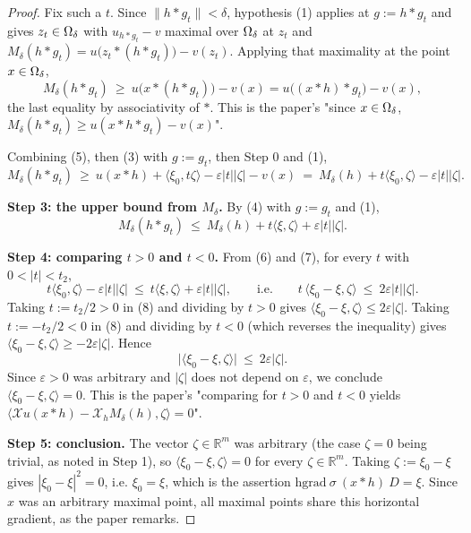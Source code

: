 \begin{proof}
Fix such a $t$. Since $\|h*g_t\|<\delta$, hypothesis (1) applies at $g:=h*g_t$ and gives
$z_t\in\Omega_\delta$ with $u_{h*g_t}-v$ maximal over $\Omega_\delta$ at $z_t$ and
$M_\delta(h*g_t)=u\big(z_t*(h*g_t)\big)-v(z_t)$. Applying that maximality at the point
$x\in\Omega_\delta$,
\[
 M_\delta(h*g_t)\ \ge\ u\big(x*(h*g_t)\big)-v(x)=u\big((x*h)*g_t\big)-v(x), \tag{5}
\]
the last equality by associativity of $*$. This is the paper's "since $x\in\Omega_\delta$,
$M_\delta(h*g_t)\ge u(x*h*g_t)-v(x)$".

Combining (5), then (3) with $g:=g_t$, then Step 0 and (1),
\[
 M_\delta(h*g_t)\ \ge\ u(x*h)+\langle\xi_0,t\zeta\rangle-\varepsilon|t||\zeta|-v(x)
 \ =\ M_\delta(h)+t\langle\xi_0,\zeta\rangle-\varepsilon|t||\zeta| . \tag{6}
\]

\medskip\noindent\textbf{Step 3: the upper bound from $M_\delta$.} By (4) with $g:=g_t$ and
(1),
\[
 M_\delta(h*g_t)\ \le\ M_\delta(h)+t\langle\xi,\zeta\rangle+\varepsilon|t||\zeta| . \tag{7}
\]

\medskip\noindent\textbf{Step 4: comparing $t>0$ and $t<0$.} From (6) and (7), for every
$t$ with $0<|t|<t_2$,
\[
 t\langle\xi_0,\zeta\rangle-\varepsilon|t||\zeta|\ \le\ t\langle\xi,\zeta\rangle+\varepsilon|t||\zeta| ,
 \qquad\text{i.e.}\qquad
 t\,\langle\xi_0-\xi,\zeta\rangle\ \le\ 2\varepsilon|t||\zeta| . \tag{8}
\]
Taking $t:=t_2/2>0$ in (8) and dividing by $t>0$ gives
$\langle\xi_0-\xi,\zeta\rangle\le2\varepsilon|\zeta|$. Taking $t:=-t_2/2<0$ in (8) and
dividing by $t<0$ (which reverses the inequality) gives
$\langle\xi_0-\xi,\zeta\rangle\ge-2\varepsilon|\zeta|$. Hence
\[
 \big|\langle\xi_0-\xi,\zeta\rangle\big|\ \le\ 2\varepsilon|\zeta| .
\]
Since $\varepsilon>0$ was arbitrary and $|\zeta|$ does not depend on $\varepsilon$, we
conclude $\langle\xi_0-\xi,\zeta\rangle=0$. This is the paper's "comparing for $t>0$ and
$t<0$ yields $\langle\mathcal Xu(x*h)-\mathcal X_hM_\delta(h),\zeta\rangle=0$".

\medskip\noindent\textbf{Step 5: conclusion.} The vector $\zeta\in\mathbb R^{m}$ was
arbitrary (the case $\zeta=0$ being trivial, as noted in Step 1), so
$\langle\xi_0-\xi,\zeta\rangle=0$ for every $\zeta\in\mathbb R^{m}$. Taking
$\zeta:=\xi_0-\xi$ gives $|\xi_0-\xi|^{2}=0$, i.e. $\xi_0=\xi$, which is the assertion
$\mathrm{hgrad}\ \sigma\ (x*h)\ D=\xi$. Since $x$ was an arbitrary maximal point, all
maximal points share this horizontal gradient, as the paper remarks.
\end{proof}
